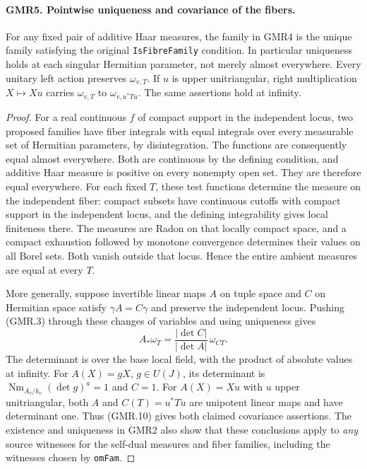 \paragraph{GMR5. Pointwise uniqueness and covariance of the fibers.}
\label{claim:GMR5}
For any fixed pair of additive Haar measures, the family in GMR4 is
the unique family satisfying the original \texttt{IsFibreFamily} condition.
In particular uniqueness holds at each singular Hermitian parameter,
not merely almost everywhere.  Every unitary left action preserves
$\omega_{v,T}$.  If $u$ is upper unitriangular, right multiplication
$X\mapsto Xu$ carries $\omega_{v,T}$ to $\omega_{v,u^*Tu}$.
The same assertions hold at infinity.

\begin{proof}
For a real continuous $f$ of compact support in the independent locus,
two proposed families have fiber integrals with equal integrals over
every measurable set of Hermitian parameters, by disintegration.
The functions are consequently equal almost everywhere.  Both are
continuous by the defining condition, and additive Haar measure is
positive on every nonempty open set.  They are therefore equal
everywhere.  For each fixed $T$, these test functions determine the
measure on the independent fiber: compact subsets have continuous
cutoffs with compact support in the independent locus, and the
defining integrability gives local finiteness there.  The measures are
Radon on that locally compact space, and a compact exhaustion followed
by monotone convergence determines their values on all Borel sets.
Both vanish outside that locus.  Hence the entire ambient measures
are equal at every $T$.

More generally, suppose invertible linear maps $A$ on tuple space and
$C$ on Hermitian space satisfy $\gamma A=C\gamma$ and preserve the
independent locus.  Pushing (GMR.3) through these changes of variables
and using uniqueness gives
\[
 A_*\omega_T=\frac{|\det C|}{|\det A|}\,\omega_{CT}.
 \tag{GMR.10}
\]
The determinant is over the base local field, with the product of
absolute values at infinity.  For $A(X)=gX$, $g\in U(J)$, its determinant
is $\operatorname{Nm}_{A_v/k_v}(\det g)^a=1$ and $C=1$.
For $A(X)=Xu$ with $u$ upper unitriangular, both $A$ and
$C(T)=u^*Tu$ are unipotent linear maps and have determinant one.
Thus (GMR.10) gives both claimed covariance assertions.  The existence
and uniqueness in GMR2 also show that these conclusions apply to
\emph{any} source witnesses for the self-dual measures and fiber
families, including the witnesses chosen by \texttt{omFam}.
\end{proof}

